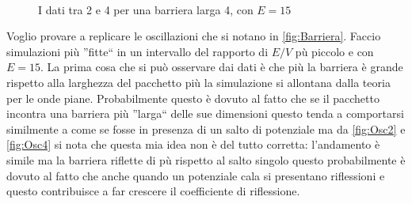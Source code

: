 \begin{figure}[hbt]
  \centering
  \begin{subfigure}[b]{0.49\textwidth}
  \end{subfigure}
  ~
  \begin{subfigure}[b]{0.49\textwidth}
  \end{subfigure}
  \caption{I dati tra 2 e 4 per una barriera larga 4, con $E=15$}\label{fig:Osc4}
\end{figure}

Voglio provare a replicare le oscillazioni che si notano in \autoref{fig:Barriera}.
Faccio simulazioni pi\`u ''fitte`` in un intervallo del rapporto di $E/V$ p\`u piccolo e con $E=15$.
La prima cosa che si pu\`o osservare dai dati \`e che pi\`u la barriera \`e  grande rispetto alla larghezza del pacchetto pi\`u la simulazione si allontana dalla teoria per le onde piane.
Probabilmente questo \`e dovuto al fatto che se il pacchetto incontra una barriera pi\`u ''larga`` delle sue dimensioni questo tenda a comportarsi similmente a come se fosse in presenza di un salto di potenziale ma da \autoref{fig:Osc2} e \autoref{fig:Osc4} si nota che questa mia idea non \`e del tutto corretta: l'andamento \`e simile ma la barriera riflette di p\`u rispetto al salto singolo questo probabilmente \`e dovuto al fatto che  anche quando un potenziale cala si presentano riflessioni e questo contribuisce a far crescere il coefficiente di riflessione.


